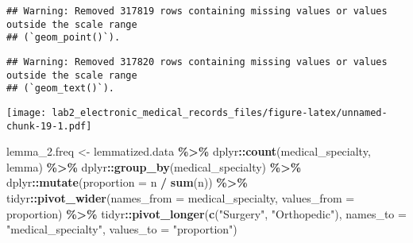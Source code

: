 \documentclass[
]{article}
\newenvironment{Shaded}{\begin{snugshade}}{\end{snugshade}}
\newcommand{\AttributeTok}[1]{\textcolor[rgb]{0.13,0.29,0.53}{#1}}
\newcommand{\FunctionTok}[1]{\textcolor[rgb]{0.13,0.29,0.53}{\textbf{#1}}}
\newcommand{\NormalTok}[1]{#1}
\newcommand{\OtherTok}[1]{\textcolor[rgb]{0.56,0.35,0.01}{#1}}
\newcommand{\SpecialCharTok}[1]{\textcolor[rgb]{0.81,0.36,0.00}{\textbf{#1}}}
\newcommand{\StringTok}[1]{\textcolor[rgb]{0.31,0.60,0.02}{#1}}
\begin{document}
\begin{verbatim}
## Warning: Removed 317819 rows containing missing values or values outside the scale range
## (`geom_point()`).
\end{verbatim}

\begin{verbatim}
## Warning: Removed 317820 rows containing missing values or values outside the scale range
## (`geom_text()`).
\end{verbatim}

\texttt{[image: lab2\_electronic\_medical\_records\_files/figure-latex/unnamed-chunk-19-1.pdf]}

\begin{Shaded}
\begin{Highlighting}[]
\NormalTok{lemma\_2.freq }\OtherTok{\textless{}{-}}\NormalTok{ lemmatized.data }\SpecialCharTok{\%\textgreater{}\%} 
\NormalTok{  dplyr}\SpecialCharTok{::}\FunctionTok{count}\NormalTok{(medical\_specialty, lemma) }\SpecialCharTok{\%\textgreater{}\%}
\NormalTok{  dplyr}\SpecialCharTok{::}\FunctionTok{group\_by}\NormalTok{(medical\_specialty) }\SpecialCharTok{\%\textgreater{}\%} 
\NormalTok{  dplyr}\SpecialCharTok{::}\FunctionTok{mutate}\NormalTok{(}\AttributeTok{proportion =}\NormalTok{ n }\SpecialCharTok{/} \FunctionTok{sum}\NormalTok{(n)) }\SpecialCharTok{\%\textgreater{}\%}
\NormalTok{  tidyr}\SpecialCharTok{::}\FunctionTok{pivot\_wider}\NormalTok{(}\AttributeTok{names\_from =}\NormalTok{ medical\_specialty, }\AttributeTok{values\_from =}\NormalTok{ proportion) }\SpecialCharTok{\%\textgreater{}\%}
\NormalTok{  tidyr}\SpecialCharTok{::}\FunctionTok{pivot\_longer}\NormalTok{(}\FunctionTok{c}\NormalTok{(}\StringTok{"Surgery"}\NormalTok{, }\StringTok{"Orthopedic"}\NormalTok{),}
               \AttributeTok{names\_to =} \StringTok{"medical\_specialty"}\NormalTok{, }\AttributeTok{values\_to =} \StringTok{"proportion"}\NormalTok{)}


\end{Highlighting}
\end{Shaded}
\end{document}
